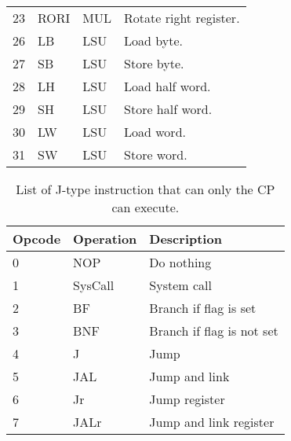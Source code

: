 \begin{table}[h]
\begin{center}
\begin{tabular}{@{}p{}p{}p{}p{}@{}}
23 & RORI & MUL	& Rotate right register. \\ 
26 & LB & LSU		& Load byte. \\ 
27 & SB & LSU		& Store byte. \\ 
28 & LH & LSU		& Load half word. \\ 
29 & SH & LSU		& Store half word. \\ 
30 & LW & LSU		& Load word. \\ 
31 & SW & LSU	& Store word. \\ 
\bottomrule
\end{tabular}
\end{center}
\label{table:i_ops}
\end{table}%

\begin{table}[h]
\caption{List of J-type instruction that can only the CP can execute.}
\begin{center}
\begin{tabular}{@{}p{}p{}p{}@{}}
\toprule
\textbf{Opcode} & \textbf{Operation} & \textbf{Description}\\ \hline
0 & NOP & Do nothing \\ 
1 & SysCall & System call \\ 
2 & BF & Branch if flag is set \\ 
3 & BNF & Branch if flag is not set \\ 
4 & J & Jump \\ 
5 & JAL & Jump and link \\ 
6 & Jr & Jump register \\ 
7 & JALr & Jump and link register \\ 
\bottomrule
\end{tabular}
\end{center}
\label{table:j_ops}
\end{table}%